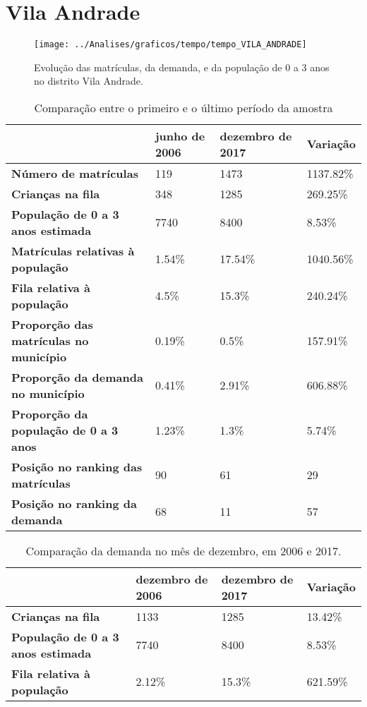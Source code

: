 \section{Vila Andrade}
\begin{figure}[H]
\centering
\texttt{[image: ../Analises/graficos/tempo/tempo\_VILA\_ANDRADE]}
\caption{Evolução das matrículas, da demanda, e da população de 0 a 3 anos no distrito Vila Andrade.}
\end{figure}
\begin{table}[H]
\begin{tabular}{|l|l|l|l|}
\hline
\textbf{}                                      & \textbf{junho de 2006}       & \textbf{dezembro de 2017}    & \textbf{Variação} \\ \hline
\textbf{Número de matrículas}                  & 119 & 1473 & 1137.82\% \\ \hline
\textbf{Crianças na fila}                      & 348 & 1285 & 269.25\% \\ \hline
\textbf{População de 0 a 3 anos estimada}      & 7740 & 8400 & 8.53\% \\ \hline
\textbf{Matrículas relativas à população}      & 1.54\% & 17.54\% & 1040.56\% \\ \hline
\textbf{Fila relativa à população}             & 4.5\% & 15.3\% & 240.24\% \\ \hline
\textbf{Proporção das matrículas no município} & 0.19\% & 0.5\% & 157.91\% \\ \hline
\textbf{Proporção da demanda no município}     & 0.41\% & 2.91\% & 606.88\% \\ \hline
\textbf{Proporção da população de 0 a 3 anos}  & 1.23\% & 1.3\% & 5.74\% \\ \hline
\textbf{Posição no ranking das matrículas}     & 90 & 61 & 29 \\ \hline
\textbf{Posição no ranking da demanda}         & 68 & 11 & 57 \\ \hline
\end{tabular}
\caption{Comparação entre o primeiro e o último período da amostra}
\end{table}
\begin{table}[H]
\begin{tabular}{|l|l|l|l|}
\hline
\textbf{}                                 & \textbf{dezembro de 2006} & \textbf{dezembro de 2017} & \textbf{Variação} \\ \hline
\textbf{Crianças na fila}                      & 1133 & 1285 & 13.42\% \\ \hline
\textbf{População de 0 a 3 anos estimada}      & 7740 & 8400 & 8.53\% \\ \hline
\textbf{Fila relativa à população}             & 2.12\% & 15.3\% & 621.59\% \\ \hline
\end{tabular}
\caption{Comparação da demanda no mês de dezembro, em 2006 e 2017.}
\end{table}
